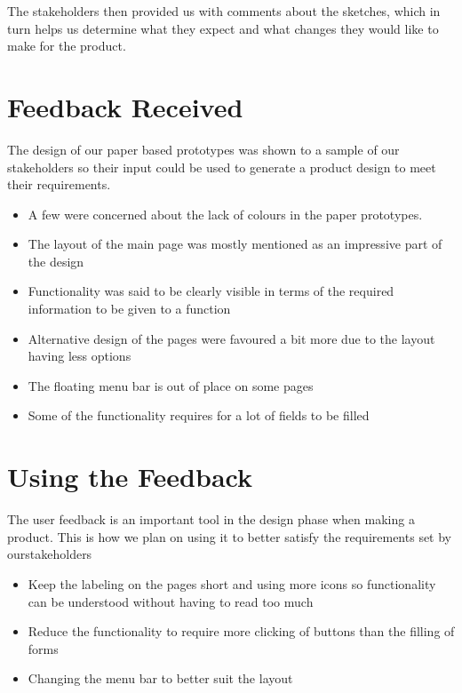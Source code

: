 \documentclass[11pt]{article}
\begin{document}
	The stakeholders then provided us with comments about the sketches, which in turn helps us determine what they expect and what changes they would like to make for the product.

\section{Feedback Received}
	The design of our paper based prototypes was shown to a sample of our stakeholders so their input could be used to generate a product design to meet their requirements.
	\begin{itemize}
		\item A few were concerned about the lack of colours in the paper prototypes.
		\item The layout of the main page was mostly mentioned as an impressive part of the design
		\item Functionality was said to be clearly visible in terms of the required information to be given to a function
		\item Alternative design of the pages were favoured a bit more due to the layout having less options
		\item The floating menu bar is out of place on some pages
		\item Some of the functionality requires for a lot of fields to be filled
	\end{itemize}
\section{Using the Feedback}
	The user feedback is an important tool in the design phase when making a product. This is how we plan on using it to better satisfy the requirements set by ourstakeholders
	\begin{itemize}
		\item Keep the labeling on the pages short and using more icons so functionality can be understood without having to read too much	
		\item Reduce the functionality to require more clicking of buttons than the filling of forms
		\item Changing the menu bar to better suit the layout
	\end{itemize}
\end{document}
